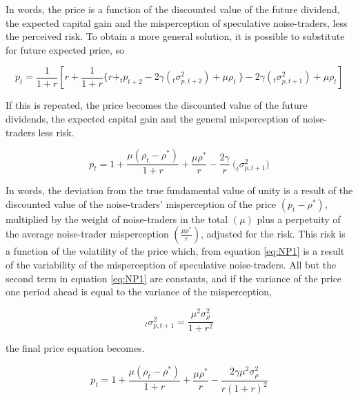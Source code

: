 \documentclass[12pt, a4paper, oneside]{article} %
\begin{document}
In words, the price is a function of the discounted value of the future dividend, the expected capital gain and the misperception of speculative noise-traders, less the perceived risk.  To obtain a more general solution, it is possible to substitute for future expected price, so 

\begin{equation}
p_t = \frac{1}{1+r} \left [ r + \frac{1}{1 + r} \big \{  r + _tp_{t+2} - 2\gamma(_t\sigma^2_{p,t+2}) + \mu\rho_t \ \big \}  - 2\gamma(_t\sigma^2_{p,t+1}) + \mu\rho_t \right ]
\end{equation}  

If this is repeated,  the price becomes the discounted value of the future dividends, the expected capital gain and the general misperception of noise-traders less risk.  

\begin{equation}
p_t = 1 + \frac{\mu(\rho_t - \rho^*)}{1 + r} + \frac{ \mu \rho^*}{r} - \frac{2 \gamma}{r}\ \big (_t\sigma^2_{p,t+1} \big )
\label{eq:NP1}
\end{equation} 

In words, the deviation from the true fundamental value of unity is a result of the discounted value of the noise-traders' misperception of the price $(p_t - \rho^*)$, multiplied by the weight of noise-traders in the total $(\mu)$ plus a perpetuity of the average noise-trader misperception $(\frac{ \mu \rho^*}{r} )$, adjusted for the risk.   This risk is a function of the volatility of the price which,  from equation \ref{eq:NP1} is a result of the variability of the misperception of speculative noise-traders.   All but the second term in equation \ref{eq:NP1} are constants, and if the variance of the price one period ahead  is equal to the variance of the misperception, 

\begin{equation} 
 _t\sigma^2_{p,t+1} = \frac{\mu^2 \sigma_{\rho}^2}{1+r^2}  
\end{equation}

the final price equation becomes.

\begin{equation}
p_t = 1 + \frac{\mu(\rho_t - \rho^*)}{1 + r} + \frac{ \mu \rho^*}{r} - \frac{2 \gamma \mu^2 \sigma_{\rho}^2}{r(1 + r)^2}
\label{eq:NP2}
\end{equation} 
\end{document}
